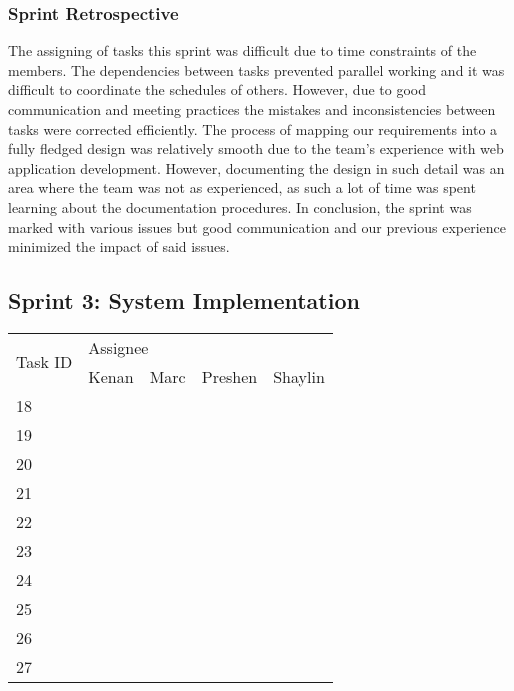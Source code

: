 \documentclass[11pt]{article}
\begin{document}
\subsubsection{Sprint Retrospective}
The assigning of tasks this sprint was difficult due to time constraints of the members. The dependencies between tasks prevented parallel working and it was difficult to coordinate the schedules of others. However, due to good communication and meeting practices the mistakes and inconsistencies between tasks were corrected efficiently. The process of mapping our requirements into a fully fledged design was relatively smooth due to the team's experience with web application development. However, documenting the design in such detail was an area where the team was not as experienced, as such a lot of time was spent learning about the documentation procedures. In conclusion, the sprint was marked with various issues but good communication and our previous experience minimized the impact of said issues. 
\subsection{Sprint 3: System Implementation}
\begin{table}[H]
	\begin{tabular}{@{}|l||l|l|l|l|@{}}
		\toprule
		\multirow{2}{*}{Task ID} & \multicolumn{4}{l|}{Assignee}    \\ \cmidrule(l){2-5} 
		& Kenan & Marc & Preshen & Shaylin \\ \midrule
		18	&     &  \checkmark   &    \checkmark    &        \\ \midrule
		19	&  \checkmark   &   \checkmark  & \checkmark       & \checkmark   \\ \midrule
		20	&     &   \checkmark  &   \checkmark     &    \\ \midrule
		21	&     &  \checkmark   &   \checkmark     &     \\ \midrule
		22	&     &  \checkmark   &   \checkmark     &     \\ \midrule
		23	&   \checkmark  &  \checkmark   &   \checkmark     &  \checkmark   \\ \midrule
		24	&     &  \checkmark   &   \checkmark     &     \\ \midrule
		25	&     &  \checkmark   &   \checkmark     &     \\ \midrule
		26	&     &  \checkmark   &   \checkmark     &     \\ \midrule
		27	&   \checkmark  &   \checkmark  &   \checkmark     &    \\ \bottomrule
	\end{tabular}
\end{table}
\end{document}
